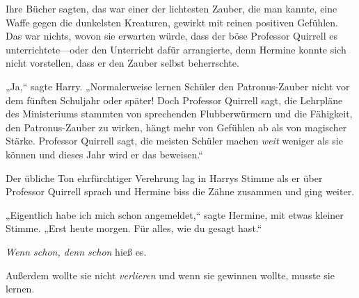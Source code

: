 Ihre Bücher sagten, das war einer der lichtesten Zauber, die man kannte, eine Waffe gegen die dunkelsten Kreaturen, gewirkt mit reinen positiven Gefühlen. Das war nichts, wovon sie erwarten würde, dass der böse Professor Quirrell es unterrichtete—oder den Unterricht dafür arrangierte, denn Hermine konnte sich nicht vorstellen, dass er den Zauber selbst beherrschte.

„Ja,“ sagte Harry. „Normalerweise lernen Schüler den Patronus-Zauber nicht vor dem fünften Schuljahr oder später! Doch Professor Quirrell sagt, die Lehrpläne des Ministeriums stammten von sprechenden Flubberwürmern und die Fähigkeit, den Patronus-Zauber zu wirken, hängt mehr von Gefühlen ab als von magischer Stärke. Professor Quirrell sagt, die meisten Schüler machen \emph{weit} weniger als sie können und dieses Jahr wird er das beweisen.“

Der übliche Ton ehrfürchtiger Verehrung lag in Harrys Stimme als er über Professor Quirrell sprach und Hermine biss die Zähne zusammen und ging weiter.

„Eigentlich habe ich mich schon angemeldet,“ sagte Hermine, mit etwas kleiner Stimme. „Erst heute morgen. Für alles, wie du gesagt hast.“

\emph{Wenn schon, denn schon} hieß es.

Außerdem wollte sie nicht \emph{verlieren} und wenn sie gewinnen wollte, musste sie lernen.

